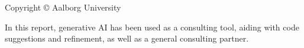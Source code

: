 \thispagestyle{empty}
{\small
\strut\vfill %
\noindent Copyright \copyright{} Aalborg University \THEYEAR\par
\vspace{0.2cm}
\noindent In this report, generative AI has been used as a consulting tool, aiding with code suggestions and refinement, as well as a general consulting partner.


}

\clearpage